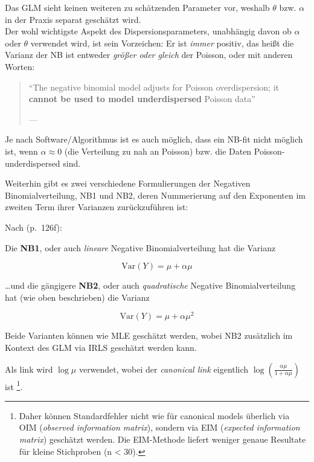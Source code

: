 \documentclass[ngerman,a4paper,]{scrartcl}
\let\rmarkdownfootnote\footnote%
\def\footnote{\protect\rmarkdownfootnote}
\theoremstyle{definition}
\theoremstyle{definition}
\theoremstyle{definition}
\theoremstyle{remark}
\let\BeginKnitrBlock\begin \let\EndKnitrBlock\end
\begin{document}
Das GLM sieht keinen weiteren zu schätzenden Parameter vor, weshalb \(\theta\) bzw. \(\alpha\) in der Praxis separat geschätzt wird.\\
Der wohl wichtigste Aspekt des Dispersionsparameters, unabhängig davon ob \(\alpha\) oder \(\theta\) verwendet wird, ist sein Vorzeichen: Er ist \emph{immer} positiv, das heißt die Varianz der NB ist entweder \emph{größer oder gleich} der Poisson, oder mit anderen Worten:

\begin{quote}
\enquote{The negative binomial model adjusts for Poisson overdispersion; it \textbf{cannot be used to model underdispersed} Poisson data}

--- \citep[ (p.~11), eigene Hervorhebung]{hilbeModelingCountData2014}
\end{quote}

Je nach Software/Algorithmus ist es auch möglich, dass ein NB-fit nicht möglich ist, wenn \(\alpha \approx 0\) (die Verteilung zu nah an Poisson) bzw. die Daten Poisson-underdispersed sind.

Weiterhin gibt es zwei verschiedene Formulierungen der Negativen Binomialverteilung, NB1 und NB2, deren Nummerierung auf den Exponenten im zweiten Term ihrer Varianzen zurückzuführen ist:

\BeginKnitrBlock{definition}[NB1 und NB2]
\protect\hypertarget{def:defNB1NB2}{}{\label{def:defNB1NB2} \iffalse (NB1 und NB2) \fi{} }Nach \citet{hilbeModelingCountData2014} (p.~126f):

Die \textbf{NB1}, oder auch \emph{lineare} Negative Binomialverteilung hat die Varianz

\begin{equation*}
\mathrm{Var}(Y) = \mu + \alpha \mu
\end{equation*}

\ldots{}und die gängigere \textbf{NB2}, oder auch \emph{quadratische} Negative Binomialverteilung hat (wie oben beschrieben) die Varianz

\begin{equation*}
\mathrm{Var}(Y) = \mu + \alpha \mu^2
\end{equation*}
\EndKnitrBlock{definition}

Beide Varianten können wie MLE geschätzt werden, wobei NB2 zusätzlich im Kontext des GLM via IRLS geschätzt werden kann.

Als link wird \(\log \mu\) verwendet, wobei der \emph{canonical link} eigentlich \(\log\left(\frac{\alpha\mu}{1 + \alpha\mu}\right)\) ist \footnote{Daher können Standardfehler nicht wie für canonical models überlich via OIM (\emph{observed information matrix}), sondern via EIM (\emph{expected information matrix}) geschätzt werden. Die EIM-Methode liefert weniger genaue Resultate für kleine Stichproben (n \textless{} 30).}.
\end{document}
